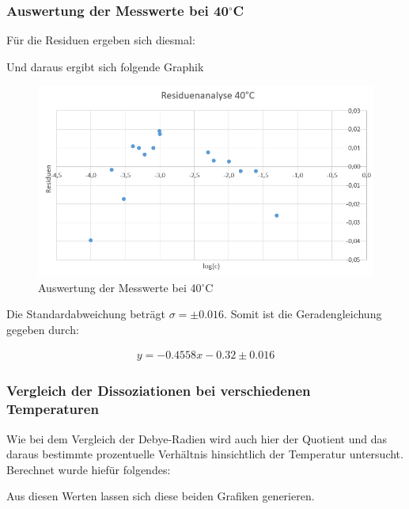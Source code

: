 \subsubsection{Auswertung der Messwerte bei 40$^\circ$C}

Für die Residuen ergeben sich diesmal: 



Und daraus ergibt sich folgende Graphik 

\begin{figure}[H]
    \centering
    \includegraphics[scale=.7]{../src/img/residuen_40C.png}
    \caption{Auswertung der Messwerte bei 40$^\circ$C}
\end{figure}

Die Standardabweichung beträgt $\sigma = \pm 0.016$. Somit ist die Geradengleichung gegeben durch:

\begin{align*}
    y = -0.4558 x - 0.32 \pm 0.016
\end{align*}


\subsubsection{Vergleich der Dissoziationen bei verschiedenen Temperaturen}

Wie bei dem Vergleich der Debye-Radien wird auch hier der Quotient und das daraus bestimmte prozentuelle Verhältnis hinsichtlich der Temperatur untersucht. 
Berechnet wurde hiefür folgendes:



Aus diesen Werten lassen sich diese beiden Grafiken generieren.

